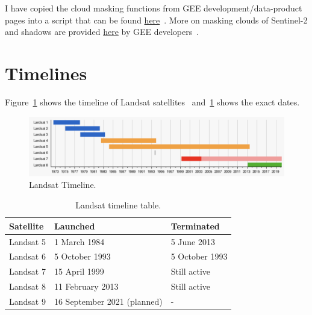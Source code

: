 \documentclass{article}
\begin{document}
I have copied the cloud masking functions
from GEE development/data-product pages into a script that can be found 
\href{https://code.earthengine.google.com/?scriptPath=users\%2Fhnoorazar\%2FGEE_Mini_Tutorial\%3ACloudMaskings}{here}~\cite{CloudandMaskingFunctionsonMyGEE}.
More on masking clouds of Sentinel-2 and shadows
are provided \href{https://developers.google.com/earth-engine/tutorials/community/sentinel-2-s2cloudless}{here} by GEE developers~\cite{CloudandShadowSentinel}.


\section{Timelines}
\label{sec:Timelines}
Figure~\ref{fig:landsatTimeline}
shows the timeline of Landsat
satellites~\cite{LandsatTimelinesWiki}
and~\cref{tab:ElevationTable} shows the
exact dates.
\begin{figure}[H]
  \includegraphics[width=1\textwidth]{figures/landsatTimeline1}
\caption{Landsat Timeline.}
\label{fig:landsatTimeline}
\end{figure}

\begin{table}[]
\centering
\caption{Landsat timeline table.} 
\label{tab:ElevationTable}
\begin{tabular}{|l|l|l|}
\hline
\rowcolor{shadecolor} 
\small{Satellite} & 
\small{Launched} & 
\small{Terminated} \\
\hline
Landsat 5 & 1 March 1984 & 5 June 2013 \\ 
\hline
\rowcolor{aliceblue} 
Landsat 6 & 5 October 1993  & 5 October 1993 \\ \hline
Landsat 7 & 15 April 1999 & Still active \\ \hline
\rowcolor{aliceblue} 
Landsat 8 & 11 February 2013 & Still active \\ \hline
Landsat 9 & 16 September 2021 (planned) & - \\ \hline
\end{tabular}
\end{table}

\end{document}
